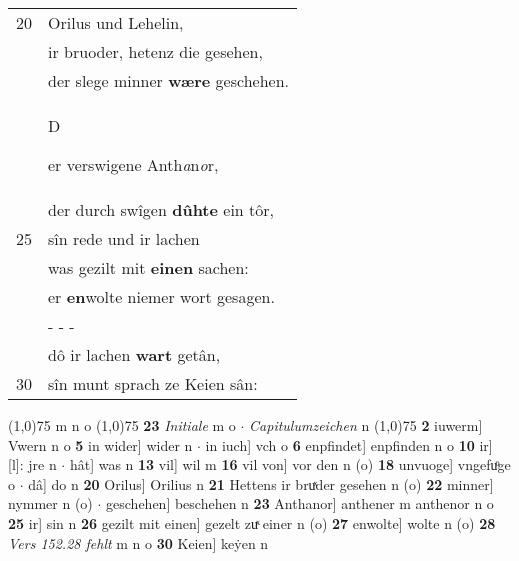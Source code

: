 \documentclass[8pt,a4paper,notitlepage]{article}
\begin{document}
\begin{table}[ht]
\begin{minipage}[t]{0.5\linewidth}
\begin{tabular}{rl}
20 & Orilus und Lehelin,\\ 
 & ir bruoder, hetenz die gesehen,\\ 
 & der slege minner \textbf{wære} geschehen.\\ 
 & \begin{large}D\end{large}er verswigene Anth\textit{a}n\textit{o}r,\\ 
 & der durch swîgen \textbf{dûhte} ein tôr,\\ 
25 & sîn rede und ir lachen\\ 
 & was gezilt mit \textbf{einen} sachen:\\ 
 & er \textbf{en}wolte niemer wort gesagen.\\ 
 & \multicolumn{1}{l}{ - - - }\\ 
 & dô ir lachen \textbf{wart} getân,\\ 
30 & sîn munt sprach ze Keien sân:\\ 
\end{tabular}
\scriptsize
\line(1,0){75} \newline
m n o \newline
\line(1,0){75} \newline
\textbf{23} \textit{Initiale} m o   $\cdot$ \textit{Capitulumzeichen} n  \newline
\line(1,0){75} \newline
\textbf{2} iuwerm] Vwern n o \textbf{5} in wider] wider n  $\cdot$ in iuch] vch o \textbf{6} enpfindet] enpfinden n o \textbf{10} ir] [l]: jre n  $\cdot$ hât] was n \textbf{13} vil] wil m \textbf{16} vil von] vor den n (o) \textbf{18} unvuoge] vngefuͦge o  $\cdot$ dâ] do n \textbf{20} Orilus] Orilius n \textbf{21} Hettens ir bruͯder gesehen n (o) \textbf{22} minner] nymmer n (o)  $\cdot$ geschehen] beschehen n \textbf{23} Anthanor] anthener m anthenor n o \textbf{25} ir] sin n \textbf{26} gezilt mit einen] gezelt zuͯ einer n (o) \textbf{27} enwolte] wolte n (o) \textbf{28} \textit{Vers 152.28 fehlt} m n o  \textbf{30} Keien] keẏen n \newline
\end{minipage}
\end{table}
\newpage
\end{document}
